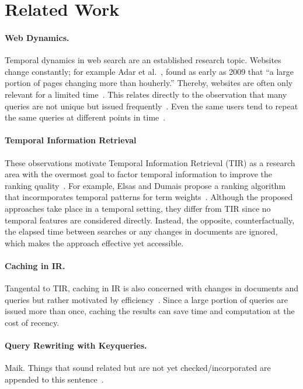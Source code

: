 \section{Related Work}
\label{sec:related-work}

\paragraph{Web Dynamics.}
Temporal dynamics in web search are an established research topic. Websites change constantly; for example Adar et al.~\cite{DBLP:conf/wsdm/AdarTDE09}, found as early as 2009 that ``a large portion of pages changing more than houherly.'' Thereby, websites are often only relevant for a limited time~\cite{DBLP:conf/sigir/TikhonovBBOKG13}. This relates directly to the observation that many queries are not unique but issued frequently~\cite{DBLP:conf/sigir/Dumais14,DBLP:journals/sigir/SilversteinHMM99}. Even the same users tend to repeat the same queries at different points in time~\cite{DBLP:conf/wsdm/TylerT10}.

\paragraph{Temporal Information Retrieval}
These observations motivate Temporal Information Retrieval (TIR) as a research area with the overmost goal to factor temporal information to improve the ranking quality~\cite{DBLP:journals/ftir/KanhabuaBN15,DBLP:journals/csur/CamposDJJ14}. For example, Elsas and Dumais propose a ranking algorithm that incormporates temporal patterns for term weights~\cite{DBLP:conf/wsdm/ElsasD10}. Although the proposed approaches take place in a temporal setting, they differ from TIR since no temporal features are considered directly. Instead, the opposite, counterfactually, the elapsed time between searches or any changes in documents are ignored, which makes the approach effective yet accessible.

\paragraph{Caching in IR.}
Tangental to TIR, caching in IR is also concerned with changes in documents and queries but rather motivated by efficiency~\cite{DBLP:conf/www/CambazogluJPBCLB10,DBLP:conf/sigir/Baeza-YatesGJMPS07}. Since a large portion of queries are issued more than once, caching the results can save time and computation at the cost of recency.


\paragraph{Query Rewriting with Keyqueries.} {\color{red} Maik.}
Things that sound related but are not yet checked/incorporated are appended to this sentence~\cite{li:2022}.

